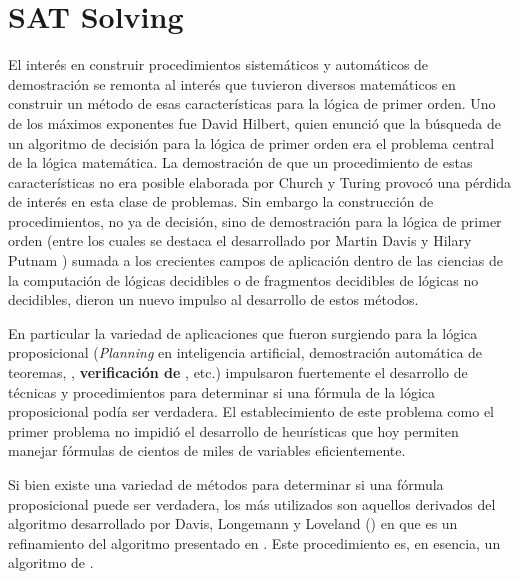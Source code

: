 

\section{SAT Solving}

El interés en construir procedimientos sistemáticos y automáticos de
demostración se remonta al interés que tuvieron diversos matemáticos en
construir un método de esas características para la lógica de primer orden. Uno
de los máximos exponentes fue David Hilbert, quien enunció que la búsqueda de un
algoritmo de decisión para la lógica de primer orden era el problema central de
la lógica matemática. La demostración de que un procedimiento de estas
características no era posible elaborada por Church y Turing provocó una pérdida
de interés en esta clase de problemas. Sin embargo la construcción de
procedimientos, no ya de decisión, sino de demostración para la lógica de primer
orden (entre los cuales se destaca el desarrollado por Martin Davis y Hilary
Putnam \cite{Davis:1960:CPQ:321033.321034}) sumada a los crecientes campos de
aplicación dentro de las ciencias de la computación de lógicas decidibles o de
fragmentos decidibles de lógicas no decidibles, dieron un nuevo impulso al
desarrollo de estos métodos. 

En particular la variedad de aplicaciones que fueron surgiendo para la lógica
proposicional (\emph{Planning} en inteligencia artificial, demostración
automática de teoremas, \textbf{\mc}, \textbf{verificación de \soft}, etc.)
impulsaron fuertemente el desarrollo de técnicas y procedimientos para
determinar si una fórmula de la lógica proposicional podía ser verdadera. El
establecimiento de este problema como el primer problema \npc
\cite{Cook:1971:CTP:800157.805047} no impidió el desarrollo de heurísticas que
hoy permiten manejar fórmulas de cientos de miles de variables eficientemente.

Si bien existe una variedad de métodos para determinar si una fórmula
proposicional puede ser verdadera, los más utilizados son aquellos derivados del
algoritmo desarrollado por Davis, Longemann y Loveland (\dpll) en
\cite{Davis:1962:MPT:368273.368557} que es un refinamiento del algoritmo
presentado en \cite{Davis:1960:CPQ:321033.321034}. Este procedimiento es, en
esencia, un algoritmo de \bt.

